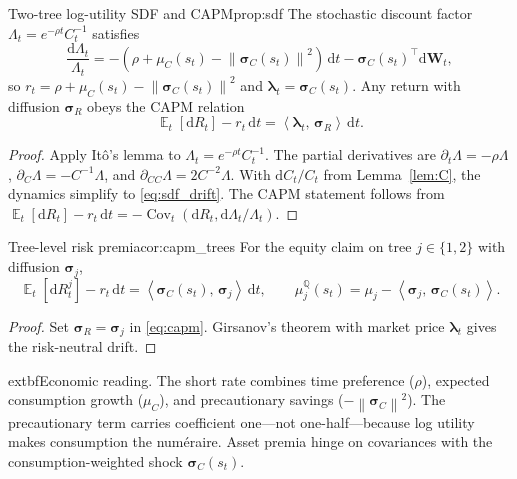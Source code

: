 ﻿\documentclass[11pt,letterpaper,oneside]{article}
\numberwithin{equation}{section}
\DeclareMathOperator{\E}{\mathbb{E}}
\DeclareMathOperator{\Cov}{\mathrm{Cov}}
\newcommand{\1}{\mathbf{1}}
\newcommand{\diff}{\mathrm{d}}
\newcommand{\norm}[1]{\left\lVert #1\right\rVert}
\newcommand{\ip}[2]{\left\langle #1,\,#2\right\rangle}
\begin{document}
\begin{proposition}{Two-tree log-utility SDF and CAPM}{prop:sdf}
The stochastic discount factor $\Lambda_t=e^{-\rho t}C_t^{-1}$ satisfies
\begin{equation}\label{eq:sdf_drift}
  \frac{\diff \Lambda_t}{\Lambda_t}=-(\rho+\mu_C(s_t)-\norm{\bm{\sigma}_C(s_t)}^2)\,\diff t-\bm{\sigma}_C(s_t)^{\top}\diff \bm{W}_t,
\end{equation}
so $r_t=\rho+\mu_C(s_t)-\norm{\bm{\sigma}_C(s_t)}^2$ and $\bm{\lambda}_t=\bm{\sigma}_C(s_t)$. Any return with diffusion $\bm{\sigma}_R$ obeys the CAPM relation
\begin{equation}\label{eq:capm}
  \E_t[\diff R_t]-r_t\,\diff t=\ip{\bm{\lambda}_t}{\bm{\sigma}_R}\,\diff t.
\end{equation}
\end{proposition}
\begin{proof}
Apply It\^o's lemma to $\Lambda_t = e^{-\rho t} C_t^{-1}$. The partial derivatives are $\partial_t\Lambda=-\rho\Lambda$, $\partial_C\Lambda=-C^{-1}\Lambda$, and $\partial_{CC}\Lambda=2C^{-2}\Lambda$. With $\diff C_t/C_t$ from Lemma~\ref{lem:C}, the dynamics simplify to \eqref{eq:sdf_drift}. The CAPM statement follows from $\E_t[\diff R_t]-r_t\,\diff t=-\Cov_t(\diff R_t,\diff\Lambda_t/\Lambda_t)$.
\end{proof}

\begin{corollary}{Tree-level risk premia}{cor:capm_trees}
For the equity claim on tree $j\in\{1,2\}$ with diffusion $\bm{\sigma}_j$,
\begin{equation}\label{eq:tree_capm}
  \E_t[\diff R^j_t]-r_t\,\diff t=\ip{\bm{\sigma}_C(s_t)}{\bm{\sigma}_j}\,\diff t,
  \qquad
  \mu_j^{\mathbb{Q}}(s_t)=\mu_j-\ip{\bm{\sigma}_j}{\bm{\sigma}_C(s_t)}.
\end{equation}
\end{corollary}
\begin{proof}
Set $\bm{\sigma}_R=\bm{\sigma}_j$ in \eqref{eq:capm}. Girsanov's theorem with market price $\bm{\lambda}_t$ gives the risk-neutral drift.
\end{proof}

\begin{tcolorbox}[didacticstyle]
  	extbf{Economic reading.} The short rate combines time preference ($\rho$), expected consumption growth ($\mu_C$), and precautionary savings ($-\norm{\bm{\sigma}_C}^2$). The precautionary term carries coefficient one---not one-half---because log utility makes consumption the num\'eraire. Asset premia hinge on covariances with the consumption-weighted shock $\bm{\sigma}_C(s_t)$.
\end{tcolorbox}
\end{document}
